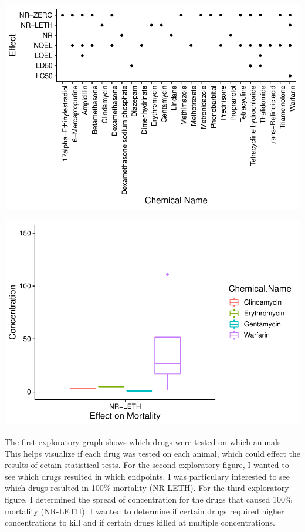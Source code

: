 \documentclass[12pt,]{article}
\begin{document}
\includegraphics{Untitled_files/figure-latex/Exploratory 2-1.pdf}

\includegraphics{Untitled_files/figure-latex/exploratory 3-1.pdf}

The first exploratory graph shows which drugs were tested on which
animals. This helps visualize if each drug was tested on each animal,
which could effect the results of cetain statistical tests. For the
second exploratory figure, I wanted to see which drugs resulted in which
endpoints. I was particulary interested to see which drugs resulted in
100\% mortality (NR-LETH). For the third exploratory figure, I
determined the spread of concentration for the drugs that caused 100\%
mortality (NR-LETH). I wanted to determine if certain drugs required
higher concentrations to kill and if certain drugs killed at multiple
concentrations.
\end{document}
